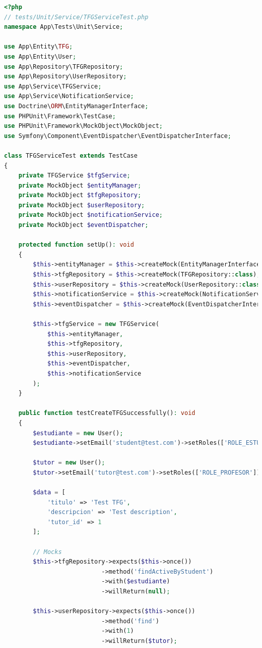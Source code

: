\documentclass[12pt,a4paper,oneside]{report}
\begin{document}
\begin{lstlisting}[language=PHP]
<?php
// tests/Unit/Service/TFGServiceTest.php
namespace App\Tests\Unit\Service;

use App\Entity\TFG;
use App\Entity\User;
use App\Repository\TFGRepository;
use App\Repository\UserRepository;
use App\Service\TFGService;
use App\Service\NotificationService;
use Doctrine\ORM\EntityManagerInterface;
use PHPUnit\Framework\TestCase;
use PHPUnit\Framework\MockObject\MockObject;
use Symfony\Component\EventDispatcher\EventDispatcherInterface;

class TFGServiceTest extends TestCase
{
    private TFGService $tfgService;
    private MockObject $entityManager;
    private MockObject $tfgRepository;
    private MockObject $userRepository;
    private MockObject $notificationService;
    private MockObject $eventDispatcher;

    protected function setUp(): void
    {
        $this->entityManager = $this->createMock(EntityManagerInterface::class);
        $this->tfgRepository = $this->createMock(TFGRepository::class);
        $this->userRepository = $this->createMock(UserRepository::class);
        $this->notificationService = $this->createMock(NotificationService::class);
        $this->eventDispatcher = $this->createMock(EventDispatcherInterface::class);

        $this->tfgService = new TFGService(
            $this->entityManager,
            $this->tfgRepository,
            $this->userRepository,
            $this->eventDispatcher,
            $this->notificationService
        );
    }

    public function testCreateTFGSuccessfully(): void
    {
        $estudiante = new User();
        $estudiante->setEmail('student@test.com')->setRoles(['ROLE_ESTUDIANTE']);

        $tutor = new User();
        $tutor->setEmail('tutor@test.com')->setRoles(['ROLE_PROFESOR']);

        $data = [
            'titulo' => 'Test TFG',
            'descripcion' => 'Test description',
            'tutor_id' => 1
        ];

        // Mocks
        $this->tfgRepository->expects($this->once())
                           ->method('findActiveByStudent')
                           ->with($estudiante)
                           ->willReturn(null);

        $this->userRepository->expects($this->once())
                           ->method('find')
                           ->with(1)
                           ->willReturn($tutor);


\end{lstlisting}
\end{document}

